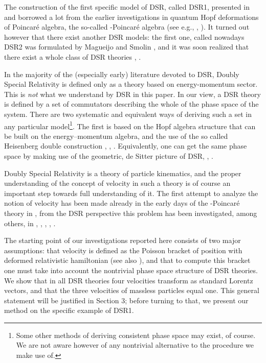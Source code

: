 \documentclass  [12pt] {article}
\begin{document}
The construction of the first specific model of DSR, called DSR1, presented in
\cite{Kowalski-Glikman:2001gp} and \cite{Bruno:2001mw} borrowed a lot from the
earlier investigations in quantum Hopf deformations of Poincar\'e algebra, the
so-called \myHighlight{$\kappa$}\coordHE{}-Poincar\'e algebra (see e.g., \cite{lunoruto}, \cite{maru}).
It turned out however that there exist another DSR models: the first one,
called nowadays DSR2 was formulated by Magueijo and Smolin
\cite{Magueijo:2001cr}, and it was soon realized that there exist a whole class
of DSR theories \cite{Kowalski-Glikman:2002we}, \cite{Kowalski-Glikman:2002jr}.

In the majority  of the (especially early) literature devoted to
DSR, Doubly Special Relativity is defined only as a theory based
on energy-momentum sector. This is {\em not} what we understand by
DSR in this paper. In our view, a DSR theory is defined by a set
of commutators describing the whole of the phase space of the
system. There are two systematic and equivalent ways of deriving
such a set in any particular model\footnote{Some other methods of
deriving consistent phase space may exist, of course. We are not
aware however of any nontrivial alternative to the procedure we
make use of.}. The first is based on the Hopf algebra structure
that can be built on the energy--momentum algebra, and the use of
the so called Heisenberg double construction \cite{luno},
\cite{crossalg},
 \cite{Kowalski-Glikman:2002jr}. Equivalently, one can get the same
phase space by making use of the geometric, de Sitter picture of DSR,
\cite{Kowalski-Glikman:2002ft}, \cite{jsnew}.
\newline

Doubly Special Relativity is a theory of particle kinematics, and the proper
understanding of the concept of velocity in such a theory is of course an
important step towards full understanding of it. The first attempt to analyze
the notion of velocity has been made already in the early days of the
\myHighlight{$\kappa$}\coordHE{}-Poincar\'e theory in \cite{Lukierski:1993wx}, from the DSR perspective
this problem has been investigated, among others, in
\cite{Kowalski-Glikman:2001px}, \cite{Lukierski:2002fd},
\cite{Amelino-Camelia:2002tc}, \cite{Kosinski:2002gu}, \cite{mignemi2003}.

The starting point of our investigations reported here consists of
two major assumptions: that velocity is defined as the Poisson
bracket of position with deformed relativistic hamiltonian (see
also \cite{Lukierski:1993wx}), and that to compute this bracket
one must take into account the nontrivial phase space structure of
DSR theories.  We show that in all DSR theories four velocities
transform as  standard Lorentz vectors, and that the three
velocities of massless particles equal one. This general statement
will be justified in Section 3; before turning to that, we present
our method on the specific example of DSR1.
\end{document}
